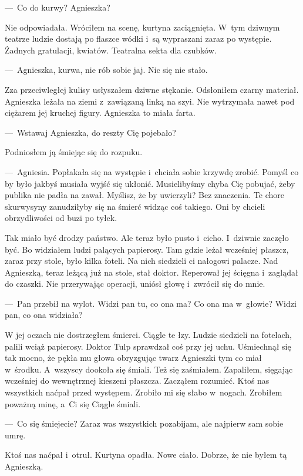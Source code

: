 ---~Co do kurwy? Agnieszka? 

Nie odpowiadała. Wróciłem na scenę, kurtyna zaciągnięta. W~tym dziwnym teatrze ludzie dostają po flaszce wódki i~są wypraszani zaraz po występie. Żadnych gratulacji, kwiatów. Teatralna sekta dla czubków. 

---~Agnieszka, kurwa, nie rób sobie jaj. Nic się nie stało.

Zza przeciwległej kulisy usłyszałem dziwne stękanie. Odsłoniłem czarny materiał. Agnieszka leżała na ziemi z~zawiązaną linką na szyi. Nie wytrzymała nawet pod ciężarem jej kruchej figury. Agnieszka to miała farta.

---~Wstawaj Agnieszka, do reszty Cię pojebało? 

Podniosłem ją śmiejąc się do rozpuku.

---~Agniesia. Popłakała się na występie i~chciała sobie krzywdę zrobić. Pomyśl co by było jakbyś musiała wyjść się ukłonić. Musielibyśmy chyba Cię pobujać, żeby publika nie padła na zawał. Myślisz, że by uwierzyli? Bez znaczenia. Te chore skurwysyny zanudziłyby się na śmierć widząc coś takiego. Oni by chcieli obrzydliwości od buzi po tyłek.

Tak miało być drodzy państwo. Ale teraz było pusto i~cicho. I~dziwnie zaczęło być. Bo widziałem ludzi palących papierosy. Tam gdzie leżał wcześniej płaszcz, zaraz przy stole, było kilka foteli. Na nich siedzieli ci nałogowi palacze. Nad Agnieszką, teraz leżącą już na stole, stał doktor. Reperował jej ścięgna i~zaglądał do czaszki. Nie przerywając operacji, uniósł głowę i~zwrócił się do mnie.

---~Pan przebił na wylot. Widzi pan tu, co ona ma? Co ona ma w~głowie? Widzi pan, co ona widziała? 

W jej oczach nie dostrzegłem śmierci. Ciągle te łzy. Ludzie siedzieli na fotelach, palili wciąż papierosy. Doktor Tulp sprawdzał coś przy jej uchu. Uśmiechnął się tak mocno, że pękła mu głowa obryzgując twarz Agnieszki tym co miał w~środku. A~wszyscy dookoła się śmiali. Też się zaśmiałem. Zapaliłem, sięgając wcześniej do wewnętrznej kieszeni płaszcza. Zacząłem rozumieć. Ktoś nas wszystkich naćpał przed występem. Zrobiło mi się słabo w~nogach. Zrobiłem poważną minę, a~Ci się Ciągle śmiali.

---~Co się śmiejecie? Zaraz was wszystkich pozabijam, ale najpierw sam sobie umrę.

Ktoś nas naćpał i~otruł. Kurtyna opadła. Nowe ciało. Dobrze, że nie byłem tą Agnieszką.
